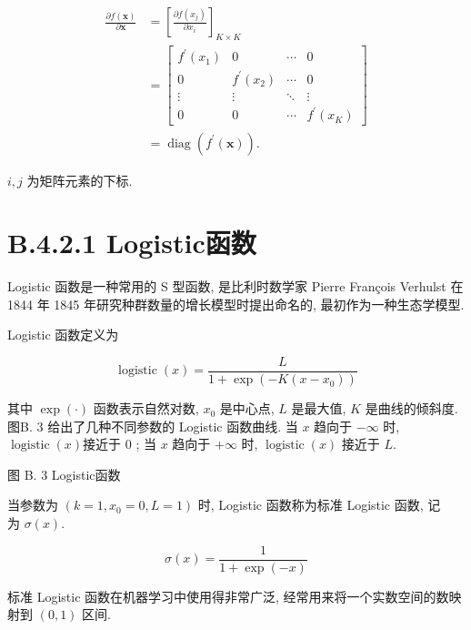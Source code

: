 \documentclass[10pt]{article}
\begin{document}
\begin{align*}
\frac{\partial f(\boldsymbol{x})}{\partial \boldsymbol{x}} & =\left[\frac{\partial f\left(x_{j}\right)}{\partial x_{i}}\right]_{K \times K}  \tag{B.25}\\
& =\left[\begin{array}{cccc}
f^{\prime}\left(x_{1}\right) & 0 & \cdots & 0 \\
0 & f^{\prime}\left(x_{2}\right) & \cdots & 0 \\
\vdots & \vdots & \ddots & \vdots \\
0 & 0 & \cdots & f^{\prime}\left(x_{K}\right)
\end{array}\right]  \tag{B.26}\\
& =\operatorname{diag}\left(f^{\prime}(\boldsymbol{x})\right) . \tag{B.27}
\end{align*}


$i, j$ 为矩阵元素的下标.

\section*{B.4.2.1 Logistic函数}
Logistic 函数是一种常用的 S 型函数, 是比利时数学家 Pierre François Verhulst 在 1844 年 1845 年研究种群数量的增长模型时提出命名的, 最初作为一种生态学模型.

Logistic 函数定义为


\begin{equation*}
\operatorname{logistic}(x)=\frac{L}{1+\exp \left(-K\left(x-x_{0}\right)\right)} \tag{B.28}
\end{equation*}


其中 $\exp (\cdot)$ 函数表示自然对数, $x_{0}$ 是中心点, $L$ 是最大值, $K$ 是曲线的倾斜度.图B. 3 给出了几种不同参数的 Logistic 函数曲线. 当 $x$ 趋向于 $-\infty$ 时, $\operatorname{logistic}(x)$接近于 0 ; 当 $x$ 趋向于 $+\infty$ 时, $\operatorname{logistic}(x)$ 接近于 $L$.



图 B. 3 Logistic函数

当参数为 $\left(k=1, x_{0}=0, L=1\right)$ 时, Logistic 函数称为标准 Logistic 函数, 记\\
为 $\sigma(x)$.


\begin{equation*}
\sigma(x)=\frac{1}{1+\exp (-x)} \tag{B.29}
\end{equation*}


标准 Logistic 函数在机器学习中使用得非常广泛, 经常用来将一个实数空间的数映射到 $(0,1)$ 区间.
\end{document}
